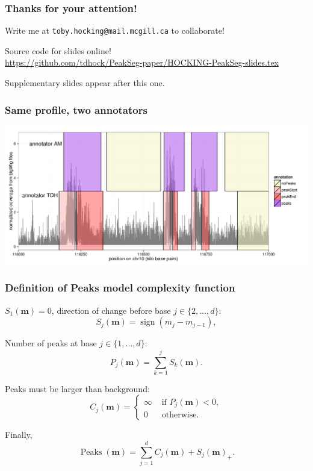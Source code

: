 \documentclass{beamer}
\DeclareMathOperator*{\Peaks}{Peaks}
\newcommand{\sign}{\operatorname{sign}}
\begin{document}
\begin{frame}
  \frametitle{Thanks for your attention!}
  Write me at \alert{\texttt{toby.hocking@mail.mcgill.ca}} to collaborate!

  \vskip 1cm

  Source code for slides online!\\
  \small
  \url{https://github.com/tdhock/PeakSeg-paper/HOCKING-PeakSeg-slides.tex}
  \vskip 1cm

  Supplementary slides appear after this one.

\end{frame}


\begin{frame}
  \frametitle{Same profile, two annotators}
  \includegraphics[width=1.1\textwidth]{figure-several-annotators}
\end{frame}

\begin{frame}
  \frametitle{Definition of Peaks model complexity function}
  $S_1(\mathbf m)=0$, direction of change before base $j\in\{2, \dots, d\}$:
  \begin{equation*}
    \label{eq:S_j}
    S_j(\mathbf m) = \sign( m_{j} - m_{j-1} ),
  \end{equation*}

  Number of peaks at base $j\in\{1, \dots, d\}$:
  \begin{equation*}
    \label{eq:P_j}
    P_j(\mathbf m) = \sum_{k=1}^j S_k(\mathbf m).
  \end{equation*}

  Peaks must be larger than background:
  \begin{equation*}
    \label{eq:C_j}
    C_j(\mathbf m) =
    \begin{cases}
      \infty & \text{ if } P_j(\mathbf m) < 0,\\
      0 & \text{ otherwise.}
    \end{cases}
  \end{equation*}
  
  Finally,
  \begin{equation*}
    \label{eq:Peaks}
    \Peaks(\mathbf m) =
    \sum_{j=1}^d 
    C_j(\mathbf m) +
    S_j(\mathbf m)_+.
  \end{equation*}
  
\end{frame}
\end{document}
